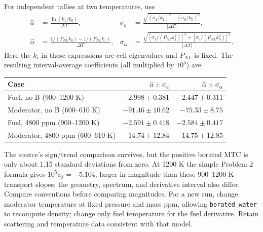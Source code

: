 \begin{adaptedsolution}
For independent tallies at two temperatures, use
\begin{align*}
\widehat a&=\frac{\ln(k_1/k_0)}{\Delta T},&
\sigma_a&=\frac{\sqrt{(\sigma_1/k_1)^2+(\sigma_0/k_0)^2}}{|\Delta T|},\\
\widehat\alpha&=\frac{1/(P_{NL}k_0)-1/(P_{NL}k_1)}{\Delta T},&
\sigma_\alpha&=\frac{\sqrt{[\sigma_1/(P_{NL}k_1^2)]^2+
[\sigma_0/(P_{NL}k_0^2)]^2}}{|\Delta T|}.
\end{align*}
Here the $k_i$ in these expressions are cell eigenvalues and $P_{NL}$ is fixed.
The resulting interval-average coefficients (all multiplied by $10^5$) are
\begin{center}\begin{tabular}{lrr}
\toprule
Case & $\widehat a\pm\sigma_a$ & $\widehat\alpha\pm\sigma_\alpha$\\\midrule
Fuel, no B (900--1200 K)&$-2.998\pm0.381$&$-2.447\pm0.311$\\
Moderator, no B (600--610 K)&$-91.46\pm10.62$&$-75.33\pm8.75$\\
Fuel, 4800 ppm (900--1200 K)&$-2.591\pm0.418$&$-2.584\pm0.417$\\
Moderator, 4800 ppm (600--610 K)&$14.74\pm12.84$&$14.75\pm12.85$\\\bottomrule
\end{tabular}\end{center}
The source's sign/trend comparison survives, but the positive borated MTC
is only about 1.15 standard deviations from zero. At 1200 K the simple
Problem 2 formula gives $10^5a_f=-5.104$, larger in magnitude than these
900--1200 K transport slopes; the geometry, spectrum, and derivative interval
also differ. Compare conventions before comparing magnitudes.
For a new run, change moderator temperature at fixed pressure and mass ppm,
allowing \texttt{borated\_water} to recompute density; change only fuel
temperature for the fuel derivative. Retain scattering and temperature data
consistent with that model.


\end{adaptedsolution}
